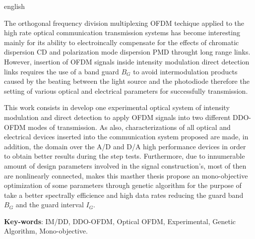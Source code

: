 \begin{resumo}[Abstract]
 \begin{otherlanguage*}{english}

The orthogonal frequency division multiplexing OFDM techique applied to the
high rate optical communication transmission systems has become interesting
mainly for its ability to electroincally compensate for the effects of
chromatic dispersion CD and polarization mode dispersion PMD throught long
range links. However, insertion of OFDM signals inside intensity modulation
direct detection links requires the use of a band guard $B_G$ to avoid
intermodulation products caused by the beating between the light source and the
photodiode therefore the setting of various optical and electrical parameters
for successfully transmission.
 
This work consists in develop one experimental optical system of intensity
modulation and direct detection to apply OFDM signals into two different
DDO-OFDM modes of transmission. As also, characterizations of all optical and
electrical devices inserted into the communication system proposed are made, in
addition, the domain over the A/D and D/A high performance devices in order to
obtain better results during the step tests. Furthermore, due to innumerable
amount of design parameters involved in the signal construction's, most of then
are nonlinearly connected, makes this masther thesis propose an mono-objective
optimization of some parameters through genetic algorithm for the purpose of
take a better spectrally efficience and high data rates reducing the guard band
$B_G$ and the guard interval $I_G$.

\vspace{\onelineskip}
\noindent 
\textbf{Key-words}: IM/DD, DDO-OFDM, Optical OFDM, Experimental, Genetic
Algorithm, Mono-objective.
 \end{otherlanguage*}
\end{resumo}